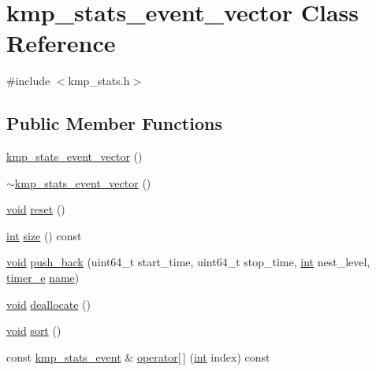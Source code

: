 \hypertarget{classkmp__stats__event__vector}{\section{kmp\-\_\-stats\-\_\-event\-\_\-vector Class Reference}
\label{classkmp__stats__event__vector}
}


{\ttfamily \#include $<$kmp\-\_\-stats.\-h$>$}

\subsection*{Public Member Functions}
\begin{DoxyCompactItemize}
\item 
\hyperlink{classkmp__stats__event__vector_a701e68fc446d80e17f17d53dab2f431b}{kmp\-\_\-stats\-\_\-event\-\_\-vector} ()
\item 
\hyperlink{classkmp__stats__event__vector_a70ac5101f972006ed50a6eea91027fc2}{$\sim$kmp\-\_\-stats\-\_\-event\-\_\-vector} ()
\item 
\hyperlink{ittnotify__static_8h_af941d56e55e3c5465135b60c4d6343ed}{void} \hyperlink{classkmp__stats__event__vector_af0e2305c77b2e724b85181f17022eab3}{reset} ()
\item 
\hyperlink{ittnotify__static_8h_a8b8dcd723308a8cb5d84277c7a3fff70}{int} \hyperlink{classkmp__stats__event__vector_afab964a97f95449b50c6f3bc05d4e872}{size} () const 
\item 
\hyperlink{ittnotify__static_8h_af941d56e55e3c5465135b60c4d6343ed}{void} \hyperlink{classkmp__stats__event__vector_a693816e35d8c355dc3441d3b94002b61}{push\-\_\-back} (uint64\-\_\-t start\-\_\-time, uint64\-\_\-t stop\-\_\-time, \hyperlink{ittnotify__static_8h_a8b8dcd723308a8cb5d84277c7a3fff70}{int} nest\-\_\-level, \hyperlink{kmp__stats_8h_ae03f1e0ff609f86afa9b7167a12c6c06}{timer\-\_\-e} \hyperlink{ittnotify__static_8h_a1c34b35a4952969fef60192313bba34a}{name})
\item 
\hyperlink{ittnotify__static_8h_af941d56e55e3c5465135b60c4d6343ed}{void} \hyperlink{classkmp__stats__event__vector_a315662bbdbed0d7303f13d3ec7ddfd0d}{deallocate} ()
\item 
\hyperlink{ittnotify__static_8h_af941d56e55e3c5465135b60c4d6343ed}{void} \hyperlink{classkmp__stats__event__vector_a51c0e7b4b746a02cd3fbcab844abe158}{sort} ()
\item 
const \hyperlink{classkmp__stats__event}{kmp\-\_\-stats\-\_\-event} \& \hyperlink{classkmp__stats__event__vector_a5fc098a513d5b7a5b2eea9e88ea4bbde}{operator\mbox{[}$\,$\mbox{]}} (\hyperlink{ittnotify__static_8h_a8b8dcd723308a8cb5d84277c7a3fff70}{int} index) const 

\end{DoxyCompactItemize}

